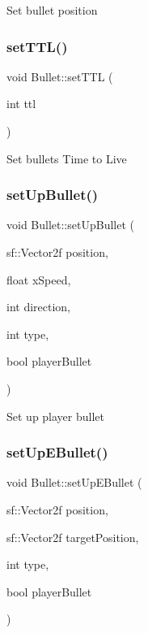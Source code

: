 Set bullet position \mbox{\label{class_bullet_abbf2bd440aade1c9f0f8f61d333ca64a}} 
\subsubsection{\texorpdfstring{set\+T\+T\+L()}{setTTL()}}
{\footnotesize\ttfamily void Bullet\+::set\+T\+TL (\begin{DoxyParamCaption}\item[{int}]{ttl }\end{DoxyParamCaption})}

Set bullets Time to Live \mbox{\label{class_bullet_a2ac1e1ac43af3bbd0d7c2a72e0e17e51}} 
\subsubsection{\texorpdfstring{set\+Up\+Bullet()}{setUpBullet()}}
{\footnotesize\ttfamily void Bullet\+::set\+Up\+Bullet (\begin{DoxyParamCaption}\item[{sf\+::\+Vector2f}]{position,  }\item[{float}]{x\+Speed,  }\item[{int}]{direction,  }\item[{int}]{type,  }\item[{bool}]{player\+Bullet }\end{DoxyParamCaption})}

Set up player bullet \mbox{\label{class_bullet_afa7788ce043c909b96c37a0265755000}} 
\subsubsection{\texorpdfstring{set\+Up\+E\+Bullet()}{setUpEBullet()}}
{\footnotesize\ttfamily void Bullet\+::set\+Up\+E\+Bullet (\begin{DoxyParamCaption}\item[{sf\+::\+Vector2f}]{position,  }\item[{sf\+::\+Vector2f}]{target\+Position,  }\item[{int}]{type,  }\item[{bool}]{player\+Bullet }\end{DoxyParamCaption})}

